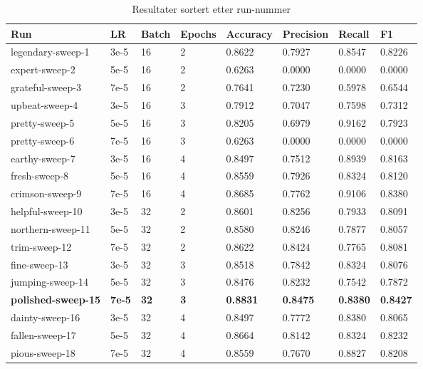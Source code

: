 \begin{table}
\caption{Resultater sortert etter run-nummer}
\label{tab:results}
\begin{tabular}{llllllll}
\toprule
Run & LR & Batch & Epochs & Accuracy & Precision & Recall & F1 \\
\midrule
legendary-sweep-1 & 3e-5 & 16 & 2 & 0.8622 & 0.7927 & 0.8547 & 0.8226 \\
expert-sweep-2 & 5e-5 & 16 & 2 & 0.6263 & 0.0000 & 0.0000 & 0.0000 \\
grateful-sweep-3 & 7e-5 & 16 & 2 & 0.7641 & 0.7230 & 0.5978 & 0.6544 \\
upbeat-sweep-4 & 3e-5 & 16 & 3 & 0.7912 & 0.7047 & 0.7598 & 0.7312 \\
pretty-sweep-5 & 5e-5 & 16 & 3 & 0.8205 & 0.6979 & 0.9162 & 0.7923 \\
pretty-sweep-6 & 7e-5 & 16 & 3 & 0.6263 & 0.0000 & 0.0000 & 0.0000 \\
earthy-sweep-7 & 3e-5 & 16 & 4 & 0.8497 & 0.7512 & 0.8939 & 0.8163 \\
fresh-sweep-8 & 5e-5 & 16 & 4 & 0.8559 & 0.7926 & 0.8324 & 0.8120 \\
crimson-sweep-9 & 7e-5 & 16 & 4 & 0.8685 & 0.7762 & 0.9106 & 0.8380 \\
helpful-sweep-10 & 3e-5 & 32 & 2 & 0.8601 & 0.8256 & 0.7933 & 0.8091 \\
northern-sweep-11 & 5e-5 & 32 & 2 & 0.8580 & 0.8246 & 0.7877 & 0.8057 \\
trim-sweep-12 & 7e-5 & 32 & 2 & 0.8622 & 0.8424 & 0.7765 & 0.8081 \\
fine-sweep-13 & 3e-5 & 32 & 3 & 0.8518 & 0.7842 & 0.8324 & 0.8076 \\
jumping-sweep-14 & 5e-5 & 32 & 3 & 0.8476 & 0.8232 & 0.7542 & 0.7872 \\
\textbf{polished-sweep-15} & \textbf{7e-5} & \textbf{32} & \textbf{3} & \textbf{0.8831} & \textbf{0.8475} & \textbf{0.8380} & \textbf{0.8427} \\
dainty-sweep-16 & 3e-5 & 32 & 4 & 0.8497 & 0.7772 & 0.8380 & 0.8065 \\
fallen-sweep-17 & 5e-5 & 32 & 4 & 0.8664 & 0.8142 & 0.8324 & 0.8232 \\
pious-sweep-18 & 7e-5 & 32 & 4 & 0.8559 & 0.7670 & 0.8827 & 0.8208 \\
\bottomrule
\end{tabular}
\end{table}

